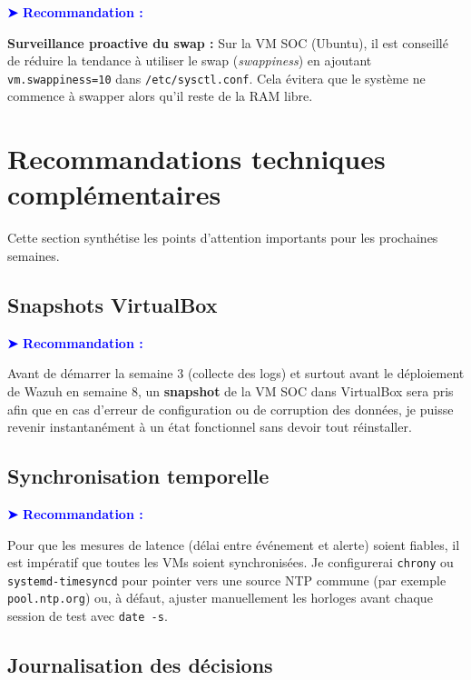 \documentclass[12pt,a4paper]{article}
\newenvironment{recommandation}{
    \vspace{0.5em}
    \noindent\textbf{\textcolor{blue}{➤ Recommandation :}}\hspace{0.5em}
}{
    \vspace{0.5em}
}
\begin{document}
\begin{recommandation}
\textbf{Surveillance proactive du swap :} Sur la VM SOC (Ubuntu), il est conseillé de réduire la tendance à utiliser le swap (\textit{swappiness}) en ajoutant \texttt{vm.swappiness=10} dans \texttt{/etc/sysctl.conf}. Cela évitera que le système ne commence à swapper alors qu'il reste de la RAM libre.
\end{recommandation}

\section{Recommandations techniques complémentaires}

Cette section synthétise les points d'attention importants pour les prochaines semaines.

\subsection{Snapshots VirtualBox}

\begin{recommandation}
Avant de démarrer la semaine 3 (collecte des logs) et surtout avant le déploiement de Wazuh en semaine 8,  un \textbf{snapshot} de la VM SOC dans VirtualBox sera pris afin que en cas d'erreur de configuration ou de corruption des données, je puisse revenir instantanément à un état fonctionnel sans devoir tout réinstaller.
\end{recommandation}

\subsection{Synchronisation temporelle}

\begin{recommandation}
Pour que les mesures de latence (délai entre événement et alerte) soient fiables, il est impératif que toutes les VMs soient synchronisées. Je configurerai \texttt{chrony} ou \texttt{systemd-timesyncd} pour pointer vers une source NTP commune (par exemple \texttt{pool.ntp.org}) ou, à défaut, ajuster manuellement les horloges avant chaque session de test avec \texttt{date -s}.
\end{recommandation}

\subsection{Journalisation des décisions}
\end{document}
